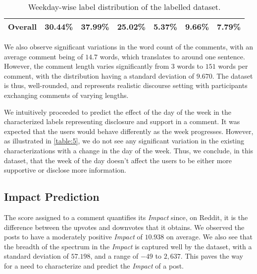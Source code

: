 \documentclass[runningheads]{llncs}
\begin{document}
\begin{table}[]
{\begin{tabular}{|l|r|r|r|r|r|r|}
\textbf{Overall}       & \textbf{30.44\%}                                                                             & \textbf{37.99\%}                                                                                 & \textbf{25.02\%}                      & \textbf{5.37\%}                                                                         & \textbf{9.66\%}                                                                               & \textbf{7.79\%}                                \\ \hline
\end{tabular}}
\caption{Weekday-wise label distribution of the labelled dataset.}
\label{table:5}
\end{table}

We also observe significant variations in the word count of the comments, with an average comment being of $14.7$ words, which translates to around one sentence\cite{SentenceLengthPaper}. However, the comment length varies significantly from $3$ words to $151$ words per comment, with the distribution having a standard deviation of $9.670$. The dataset is thus, well-rounded, and represents realistic discourse setting with participants exchanging comments of varying lengths.


We intuitively proceeded to predict the effect of the day of the week in the characterized labels representing disclosure and support in a comment. It was expected that the users would behave differently as the week progresses. However,  as illustrated in \autoref{table:5}, we do not see any significant variation in the existing characterizations with a change in the day of the week. Thus, we conclude, in this dataset, that the week of the day doesn’t affect the users to be either more supportive or disclose more information.

\subsection{Impact Prediction}

The score assigned to a comment quantifies its \textit{Impact} since, on Reddit, it is the difference between the upvotes and downvotes that it obtains. We observed the posts to have a moderately positive \textit{Impact} of $10.938$ on average. We also see that the breadth of the spectrum in the \textit{Impact} is captured well by the dataset, with a standard deviation of $57.198$, and a range of $-49$ to $2,637$. This paves the way for a need to characterize and predict the \textit{Impact} of a post.
\end{document}
